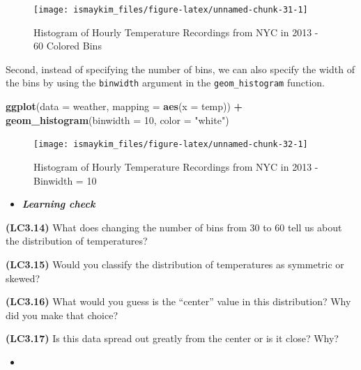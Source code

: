 \documentclass[12pt,]{krantz}
\makeatletter
\newenvironment{Shaded}{\begin{snugshade}}{\end{snugshade}}
\newcommand{\KeywordTok}[1]{\textcolor[rgb]{0.27,0.27,0.27}{\textbf{#1}}}
\newcommand{\DataTypeTok}[1]{\textcolor[rgb]{0.27,0.27,0.27}{#1}}
\newcommand{\DecValTok}[1]{\textcolor[rgb]{0.06,0.06,0.06}{#1}}
\newcommand{\StringTok}[1]{\textcolor[rgb]{0.5,0.5,0.5}{#1}}
\newcommand{\OperatorTok}[1]{\textcolor[rgb]{0.43,0.43,0.43}{\textbf{#1}}}
\newcommand{\NormalTok}[1]{#1}
\newenvironment{kframe}{%
\medskip{}
\setlength{\fboxsep}{.8em}
 \def\at@end@of@kframe{}%
 \ifinner\ifhmode%
  \def\at@end@of@kframe{\end{minipage}}%
  \begin{minipage}{\columnwidth}%
 \fi\fi%
 \def\FrameCommand##1{\hskip\@totalleftmargin \hskip-\fboxsep
 \colorbox{shadecolor}{##1}\hskip-\fboxsep
     \hskip-\linewidth \hskip-\@totalleftmargin \hskip\columnwidth}%
 \MakeFramed {\advance\hsize-\width
   \@totalleftmargin\z@ \linewidth\hsize
   \@setminipage}}%
 {\par\unskip\endMakeFramed%
 \at@end@of@kframe}
\renewenvironment{Shaded}{\begin{kframe}}{\end{kframe}}
\newenvironment{rmdblock}[1]
  {\begin{shaded*}
  \begin{itemize}
  \renewcommand{\labelitemi}{
    \raisebox{-.7\height}[0pt][0pt]{
    }
  }
  \item
  }
  {
  \end{itemize}
  \end{shaded*}
  }
\newenvironment{learncheck}
  {\begin{rmdblock}{warning}}
  {\end{rmdblock}}
\theoremstyle{definition}
\theoremstyle{definition}
\theoremstyle{definition}
\theoremstyle{remark}
\makeatother
\begin{document}
\begin{figure}

{\centering \texttt{[image: ismaykim\_files/figure-latex/unnamed-chunk-31-1]} 

}

\caption{Histogram of Hourly Temperature Recordings from NYC in 2013 - 60 Colored Bins}\label{fig:unnamed-chunk-31}
\end{figure}

Second, instead of specifying the number of bins, we can also specify
the width of the bins by using the \texttt{binwidth} argument in the
\texttt{geom\_histogram} function.

\begin{Shaded}
\begin{Highlighting}[]
\KeywordTok{ggplot}\NormalTok{(}\DataTypeTok{data =}\NormalTok{ weather, }\DataTypeTok{mapping =} \KeywordTok{aes}\NormalTok{(}\DataTypeTok{x =}\NormalTok{ temp)) }\OperatorTok{+}
\StringTok{  }\KeywordTok{geom_histogram}\NormalTok{(}\DataTypeTok{binwidth =} \DecValTok{10}\NormalTok{, }\DataTypeTok{color =} \StringTok{"white"}\NormalTok{)}
\end{Highlighting}
\end{Shaded}

\begin{figure}

{\centering \texttt{[image: ismaykim\_files/figure-latex/unnamed-chunk-32-1]} 

}

\caption{Histogram of Hourly Temperature Recordings from NYC in 2013 - Binwidth = 10}\label{fig:unnamed-chunk-32}
\end{figure}

\begin{learncheck}
\textbf{\emph{Learning check}}
\end{learncheck}

\textbf{(LC3.14)} What does changing the number of bins from 30 to 60
tell us about the distribution of temperatures?

\textbf{(LC3.15)} Would you classify the distribution of temperatures as
symmetric or skewed?

\textbf{(LC3.16)} What would you guess is the ``center'' value in this
distribution? Why did you make that choice?

\textbf{(LC3.17)} Is this data spread out greatly from the center or is
it close? Why?

\begin{learncheck}

\end{learncheck}
\end{document}
